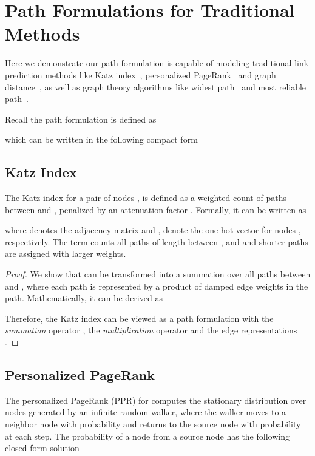 \appendix

\section{Path Formulations for Traditional Methods}
\label{app:path_formulation}

Here we demonstrate our path formulation is capable of modeling traditional link prediction methods like Katz index~\cite{katz1953new}, personalized PageRank~\cite{page1999pagerank} and graph distance~\cite{liben2007link}, as well as graph theory algorithms like widest path~\cite{baras2010path} and most reliable path~\cite{baras2010path}.

Recall the path formulation is defined as

which can be written in the following compact form


\subsection{Katz Index}
The Katz index for a pair of nodes ,  is defined as a weighted count of paths between  and , penalized by an attenuation factor . Formally, it can be written as

where  denotes the adjacency matrix and ,  denote the one-hot vector for nodes ,  respectively. The term  counts all paths of length  between , and  and shorter paths are assigned with larger weights.

\katz*
\begin{proof}
We show that  can be transformed into a summation over all paths between  and , where each path is represented by a product of damped edge weights in the path.
Mathematically, it can be derived as

Therefore, the Katz index can be viewed as a path formulation with the \emph{summation} operator , the \emph{multiplication} operator  and the edge representations .
\end{proof}

\subsection{Personalized PageRank}
The personalized PageRank (PPR) for  computes the stationary distribution over nodes generated by an infinite random walker, where the walker moves to a neighbor node with probability  and returns to the source node  with probability  at each step. The probability of a node  from a source node  has the following closed-form solution~\cite{jeh2003scaling}

